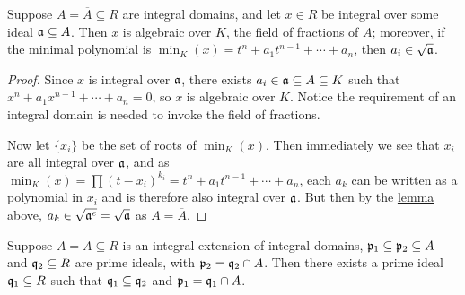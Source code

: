\begin{proposition}\label{prop:integral-minimal-polynomial}
    Suppose \(A = \overline{A} \subseteq R\) are integral domains,
    and let \(x \in R\) be integral over some ideal \(\mathfrak{a} \subseteq A\).
    Then \(x\) is algebraic over \(K\), the field of fractions of \(A\);
    moreover, if the minimal polynomial is \(\min_K(x) = t^n + a_1 t^{n-1} + \cdots + a_n\),
    then \(a_i \in \sqrt{\mathfrak{a}}\).
\end{proposition}
\begin{proof}
    Since \(x\) is integral over \(\mathfrak{a}\),
    there exists \(a_i \in \mathfrak{a} \subseteq A \subseteq K\) such that
    \(x^n + a_1 x^{n-1} + \cdots + a_n = 0\),
    so \(x\) is algebraic over \(K\).
    Notice the requirement of an integral domain is needed to invoke the field of fractions.

    Now let \({\{x_i\}}\) be the set of roots of \(\min_K(x)\).
    Then immediately we see that \(x_i\) are all integral over \(\mathfrak{a}\),
    and as \(\min_K(x) = \prod {(t-x_i)}^{k_i} = t^n + a_1 t^{n-1} + \cdots + a_n\),
    each \(a_k\) can be written as a polynomial in \(x_i\)
    and is therefore also integral over \(\mathfrak{a}\).
    But then by the \hyperref[lem:ideal-integral-closure]{lemma above},
    \(a_k \in \sqrt{\mathfrak{a}^e} = \sqrt{\mathfrak{a}}\) as \(A = \overline{A}\).
\end{proof}
\begin{theorem}
    Suppose \(A = \overline{A} \subseteq R\) is an integral extension of integral domains,
    \(\mathfrak{p}_1 \subseteq \mathfrak{p}_2 \subseteq A\) and \(\mathfrak{q}_2 \subseteq R\) are prime ideals,
    with \(\mathfrak{p}_2 = \mathfrak{q}_2 \cap A\).
    Then there exists a prime ideal \(\mathfrak{q}_1 \subseteq R\)
    such that \(\mathfrak{q}_1 \subseteq \mathfrak{q}_2\) and \(\mathfrak{p}_1 = \mathfrak{q}_1 \cap A\).
\end{theorem}
